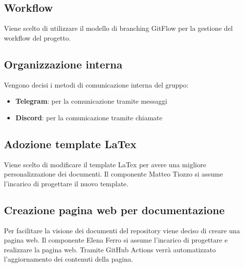 \documentclass[italian,12pt]{article} %
\begin{document}
\subsection{Workflow}
\begin{flushleft}
	Viene scelto di utilizzare il modello di branching GitFlow per la gestione del workflow del progetto.
\end{flushleft}
\subsection{Organizzazione interna}
\begin{flushleft}
	Vengono decisi i metodi di comunicazione interna del gruppo:
	\begin{itemize}
		\item \textbf{Telegram}: per la comunicazione tramite messaggi
		\item \textbf{Discord}: per la comunicazione tramite chiamate
	\end{itemize}
\end{flushleft}
\subsection{Adozione template LaTex}
\begin{flushleft}
	Viene scelto di modificare il template LaTex per avere una migliore personalizzazione dei documenti. Il componente Matteo Tiozzo si assume l'incarico di progettare il nuovo template. 
\end{flushleft}
\subsection{Creazione pagina web per documentazione}
\begin{flushleft}
	Per facilitare la visione dei documenti del repository viene deciso di creare una pagina web. Il componente Elena Ferro si assume l'incarico di progettare e realizzare la pagina web. Tramite GitHub Actions verrà automatizzato l'aggiornamento dei contenuti della pagina.
\end{flushleft}
\end{document}

